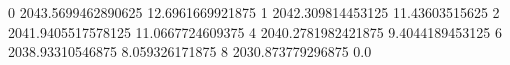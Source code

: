 0 2043.5699462890625 12.6961669921875
1 2042.309814453125 11.43603515625
2 2041.9405517578125 11.0667724609375
4 2040.2781982421875 9.4044189453125
6 2038.93310546875 8.059326171875
8 2030.873779296875 0.0
